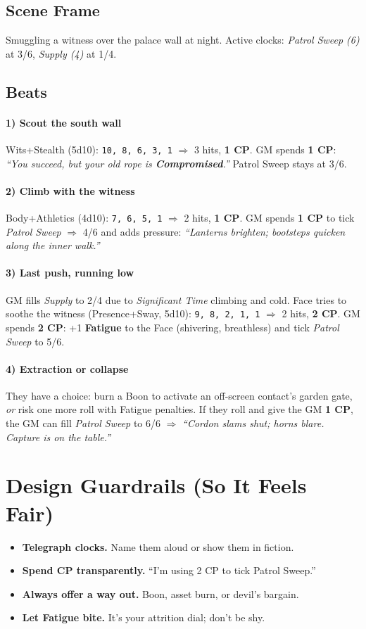 \documentclass[12pt]{book}
\begin{document}
\subsection*{Scene Frame}
Smuggling a witness over the palace wall at night. Active clocks:
\emph{Patrol Sweep (6)} at 3/6, \emph{Supply (4)} at 1/4.

\subsection*{Beats}
\paragraph{1) Scout the south wall}
Wits+Stealth (5d10): \texttt{10, 8, 6, 3, 1} $\Rightarrow$ 3 hits, \textbf{1 CP}.
GM spends \textbf{1 CP}: \emph{``You succeed, but your old rope is \textbf{Compromised}.''}
Patrol Sweep stays at 3/6.

\paragraph{2) Climb with the witness}
Body+Athletics (4d10): \texttt{7, 6, 5, 1} $\Rightarrow$ 2 hits, \textbf{1 CP}.
GM spends \textbf{1 CP} to tick \emph{Patrol Sweep} $\Rightarrow$ 4/6 and adds pressure:
\emph{``Lanterns brighten; bootsteps quicken along the inner walk.''}

\paragraph{3) Last push, running low}
GM fills \emph{Supply} to 2/4 due to \emph{Significant Time} climbing and cold.
Face tries to soothe the witness (Presence+Sway, 5d10): \texttt{9, 8, 2, 1, 1} $\Rightarrow$ 2 hits, \textbf{2 CP}.
GM spends \textbf{2 CP}: +1 \textbf{Fatigue} to the Face (shivering, breathless) and tick \emph{Patrol Sweep} to 5/6.

\paragraph{4) Extraction or collapse}
They have a choice: burn a Boon to activate an off-screen contact’s garden gate, \emph{or} risk one more roll with Fatigue penalties. If they roll and give the GM \textbf{1 CP}, the GM can fill \emph{Patrol Sweep} to 6/6 $\Rightarrow$ \emph{``Cordon slams shut; horns blare. Capture is on the table.''}

\section{Design Guardrails (So It Feels Fair)}
\begin{itemize}
  \item \textbf{Telegraph clocks.} Name them aloud or show them in fiction.
  \item \textbf{Spend CP transparently.} ``I'm using 2 CP to tick Patrol Sweep.''
  \item \textbf{Always offer a way out.} Boon, asset burn, or devil’s bargain.
  \item \textbf{Let Fatigue bite.} It's your attrition dial; don't be shy.
\end{itemize}
\end{document}
